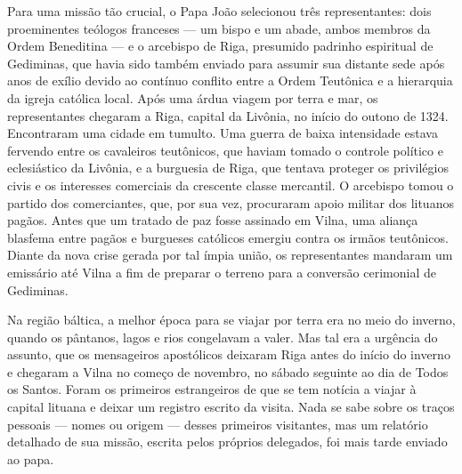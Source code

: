 %

Para uma missão tão crucial, o Papa João  selecionou três
representantes: dois proeminentes teólogos franceses --- um bispo e um
abade, ambos membros da Ordem Beneditina --- e o arcebispo de Riga,
presumido padrinho espiritual de Gediminas, que havia sido também
enviado para assumir sua distante sede após anos de exílio devido ao
contínuo conflito entre a Ordem Teutônica e a hierarquia da igreja
católica local. Após uma árdua viagem por terra e mar, os representantes
chegaram a Riga, capital da Livônia, no início do outono de 1324.
Encontraram uma cidade em tumulto. Uma guerra de baixa intensidade
estava fervendo entre os cavaleiros teutônicos, que haviam tomado o
controle político e eclesiástico da Livônia, e a burguesia de Riga, que
tentava proteger os privilégios civis e os interesses comerciais da
crescente classe mercantil. O arcebispo tomou o partido dos
comerciantes, que, por sua vez, procuraram apoio militar dos lituanos
pagãos. Antes que um tratado de paz fosse assinado em Vilna, uma aliança
blasfema entre pagãos e burgueses católicos emergiu contra os irmãos
teutônicos. Diante da nova crise gerada por tal ímpia união, os
representantes mandaram um emissário até Vilna a fim de preparar o
terreno para a conversão cerimonial de Gediminas.

Na região báltica, a melhor época para se viajar por terra era no meio
do inverno, quando os pântanos, lagos e rios congelavam a valer. Mas tal
era a urgência do assunto, que os mensageiros apostólicos deixaram Riga
antes do início do inverno e chegaram a Vilna no começo de novembro, no
sábado seguinte ao dia de Todos os Santos. Foram os primeiros
estrangeiros de que se tem notícia a viajar à capital lituana e deixar
um registro escrito da visita. Nada se sabe sobre os traços pessoais ---
nomes ou origem --- desses primeiros visitantes, mas um relatório
detalhado de sua missão, escrita pelos próprios delegados, foi mais
tarde enviado ao papa.

